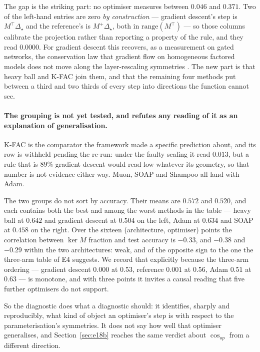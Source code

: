 \documentclass{article} %
\theoremstyle{plain}
\theoremstyle{definition}
\theoremstyle{remark}
\begin{document}
\noindent The gap is the striking part: no optimiser measures between $0.046$ and $0.371$. Two of
the left-hand entries are zero \emph{by construction} --- gradient descent's step is
$M^\top\Delta_\star$ and the reference's is $M^{+}\Delta_\star$, both in $\mathrm{range}(M^\top)$
--- so those columns calibrate the projection rather than reporting a property of the rule, and
they read $0.0000$. For gradient descent this recovers, as a measurement on gated networks, the
conservation law that gradient flow on homogeneous factored models does not move along the
layer-rescaling symmetries \citep{du2018algorithmic}. The new part is that heavy ball and K-FAC
join them, and that the remaining four methods put between a third and two thirds of every step
into directions the function cannot see.

\paragraph{The grouping is not yet tested, and refutes any reading of it as an explanation of
generalisation.} K-FAC is the comparator the framework made a specific prediction about, and its
row is withheld pending the re-run: under the faulty scaling it read $0.013$, but a rule that is
$89\%$ gradient descent would read low whatever its geometry, so that number is not evidence
either way. Muon, SOAP and Shampoo all land with Adam.

The two groups do not sort by accuracy. Their means are $0.572$ and $0.520$, and each contains both
the best and among the worst methods in the table --- heavy ball at $0.642$ and gradient descent at
$0.504$ on the left, Adam at $0.634$ and SOAP at $0.458$ on the right. Over the sixteen
(architecture, optimiser) points the correlation between $\ker M$ fraction and test accuracy is
$-0.33$, and $-0.38$ and $-0.29$ within the two architectures: weak, and of the opposite sign to
the one the three-arm table of E4 suggests. We record that explicitly because the three-arm
ordering --- gradient descent $0.000$ at $0.53$, reference $0.001$ at $0.56$, Adam $0.51$ at
$0.63$ --- is monotone, and with three points it invites a causal reading that five further
optimisers do not support.

So the diagnostic does what a diagnostic should: it identifies, sharply and reproducibly, what kind
of object an optimiser's step is with respect to the parameterisation's symmetries. It does not
say how well that optimiser generalises, and Section~\ref{sec:e18b} reaches the same verdict about
$\cos_{op}$ from a different direction.
\end{document}
